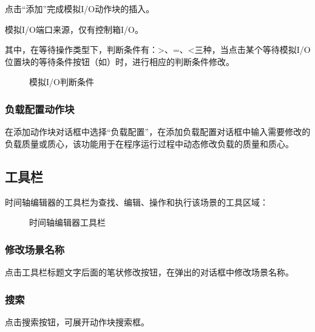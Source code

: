 点击“添加”完成模拟I/O动作块的插入。

模拟I/O端口来源，仅有控制箱I/O。

其中，在等待操作类型下，判断条件有：>、=、<三种，当点击某个等待模拟I/O位置块的等待条件按钮（如）时，进行相应的判断条件修改。

\begin{figure}[ht]
	\centering
	\color{red}{缺图}
	\caption{模拟I/O判断条件}
	\label{fig:模拟IO判断条件}
\end{figure}


\subsubsection{负载配置动作块}
在添加动作块对话框中选择“负载配置”，在添加负载配置对话框中输入需要修改的负载质量或质心，该功能用于在程序运行过程中动态修改负载的质量和质心。



\subsection{工具栏}
时间轴编辑器的工具栏为查找、编辑、操作和执行该场景的工具区域：

\begin{figure}[ht]
	\centering
	\color{red}{缺图}
	\caption{时间轴编辑器工具栏}
	\label{fig:时间轴编辑器工具栏}
\end{figure}

\subsubsection{修改场景名称}
点击工具栏标题文字后面的笔状修改按钮，在弹出的对话框中修改场景名称。
\subsubsection{搜索}
点击搜索按钮，可展开动作块搜索框。

